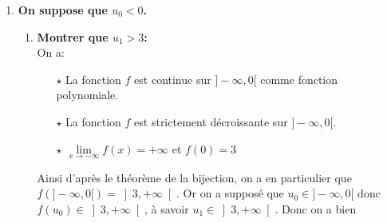 \documentclass[a4paper, 11pt]{article}
\begin{document}
\begin{correction}
\begin{enumerate}
\begin{enumerate}
\begin{itemize}
\end{itemize}
\item \textbf{\'Etudier la monotonie de la suite $\suiteu$:}\\
\noindent Soit $n\in\N$, on a: $u_{n+1}-u_n=f(u_n)-u_n=g(u_n)$. Ainsi comme le signe de $g$ est positif sur $\R$, on obtient que pour tout $n\in\N$: $u_{n+1}-u_n\geq 0$. Ainsi 
\item \textbf{\'Etudier le comportement \`{a} l'infini de la suite $\suiteu$:}
\begin{itemize}
\item[$\star$] La suite $\suiteu$ est croissante donc d'apr\`{e}s le th\'eor\`{e}me sur les suites monotones, elle converge ou elle diverge vers $+\infty$.
\item[$\star$] On suppose par l'absurde que la suite $\suiteu$ converge vers un r\'eel $l$. On a alors:
\begin{itemize}
\item[$\circ$] La suite $\suiteu$ converge vers $l$.
\item[$\circ$] Comme la suite $\suiteu$ est croissante, on a pour tout $n\in\N$: $u_n\geq u_0$.
\end{itemize}
D'apr\`{e}s le th\'eor\`{e}me de passage \`{a} la limite, on obtient donc que: $l\geq u_0$. Or par hypoth\`{e}se, on sait que $u_0>3$. Ainsi on obtient que: $l>3$. Absurde car la seule limite \'eventuelle de la suite $\suiteu$ est 3. Ainsi 
\end{itemize}
\end{enumerate} 
\item \textbf{On suppose que $u_0<0$.}
\begin{enumerate}
\item \textbf{Montrer que $u_1>3$:}\\
\noindent On a:
\begin{itemize}
\item[$\star$] La fonction $f$ est continue sur $\rbrack -\infty,0\lbrack$ comme fonction polynomiale.
\item[$\star$] La fonction $f$ est strictement d\'ecroissante sur $\rbrack -\infty,0\lbrack$.
\item[$\star$] $\lim\limits_{x\to -\infty}f(x)=+\infty$ et $f(0)=3$
\end{itemize}
Ainsi d'apr\`{e}s le th\'eor\`{e}me de la bijection, on a en particulier que $f(\rbrack -\infty,0\lbrack)=\left\rbrack 3,+\infty\right\lbrack$. Or on a suppos\'e que $u_0\in\rbrack -\infty,0\lbrack$ donc $f(u_0)\in \left\rbrack 3,+\infty\right\lbrack$, \`{a} savoir $u_1\in \left\rbrack 3,+\infty\right\lbrack$. Donc on a bien 

\end{enumerate}
\end{enumerate}
\end{correction}
\end{document}

